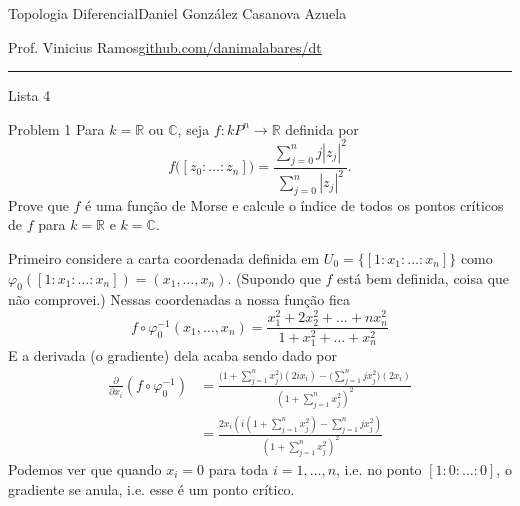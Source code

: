 
%




\begin{minipage}{\textwidth}
	\begin{minipage}{1\textwidth}
		Topologia Diferencial\hfill Daniel González Casanova Azuela
		
		{Prof. Vinicius Ramos\hfill\href{https://github.com/danimalabares/dt}{github.com/danimalabares/dt}}
	\end{minipage}
\end{minipage}\vspace{.2cm}\hrule

\vspace{10pt}
{\huge Lista 4}

\vspace{1em}

\begin{thing1}{Problem 1}\label{prob:1}\leavevmode
Para \(k=\mathbb{R}\) ou \(\mathbb{C}\), seja \(f: kP^n \longrightarrow \mathbb{R}\) definida por
\[f\Big([z_0:\ldots:z_n]\Big)=\frac{\sum_{j=0}^nj|z_j|^2}{\sum_{j=0}^n |z_j|^2}.\]
Prove que \(f\) é uma função de Morse e calcule o índice de todos os pontos críticos de \(f\) para  \(k=\mathbb{R}\) e \(k=\mathbb{C}\).
\end{thing1}

	 \iffalse Primeiro considere a carta coordenada definida em \(U_0=\{[1:x_1:\ldots:x_n]\}\) como \(\varphi_0([1:x_1:\ldots:x_n])=(x_1,\ldots,x_n)\). (Supondo que \(f\) está bem definida, coisa que não comprovei.) Nessas coordenadas a nossa função fica
	\[f \circ \varphi_0^{-1}(x_1,\ldots,x_n)=\frac{x_1^2+2x_2^2+\ldots+nx_n^2}{1+x_1^2+\ldots+x_n^2}\]
E a derivada (o gradiente) dela acaba sendo dado por
\begin{align*}\frac{\partial }{\partial x_i}(f \circ \varphi_0^{-1})&=\frac{\Big(1+\sum_{j=1}^n x_j^2\Big)(2ix_i)-\Big(\sum_{j=1}^njx_j^2\Big)(2x_i)}{\left(1+\sum_{j=1}^nx_j^2\right)^2 }\\
	&=\frac{2x_i\left(i \left(1+\sum_{j=1}^nx_j^2\right)-\sum_{j=1}^njx_j^2\right) }{\left(1+\sum_{j=1}^nx_j^2\right) ^2}
	\end{align*}
	Podemos ver que quando \(x_i=0\) para toda \(i=1,\ldots,n\), i.e. no ponto \([1:0:\ldots:0]\), o gradiente se anula, i.e. esse é um ponto crítico.

